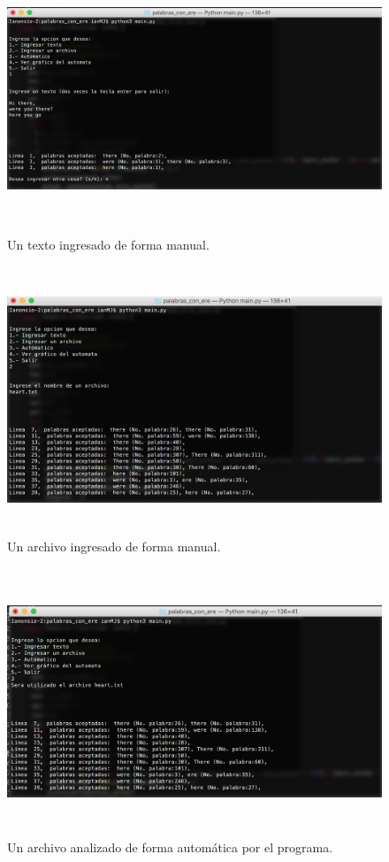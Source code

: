 \documentclass[12pt]{article}
\begin{document}
\begin{figure}[H]
\includegraphics[width=\textwidth, height=8cm]{palabras_ere_texto}
\caption{Un texto ingresado de forma manual.}
\label{fig:automata_ere_texto}
\end{figure}

\begin{figure}[H]
\includegraphics[width=\textwidth, height=8cm]{palabras_ere_archivo}
\caption{Un archivo ingresado de forma manual.}
\label{fig:automata_ere_archivo}
\end{figure}

\begin{figure}[H]
\includegraphics[width=\textwidth, height=8cm]{palabras_ere_auto}
\caption{Un archivo analizado de forma automática por el programa.}
\label{fig:automata_ere_auto}
\end{figure}
\end{document}

